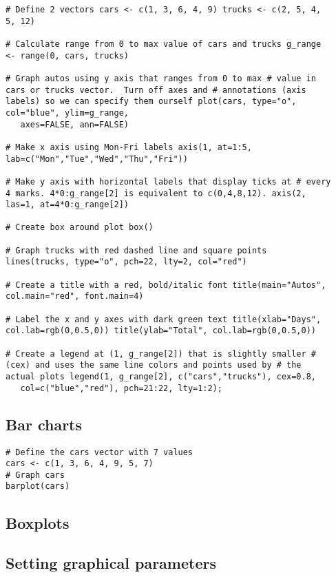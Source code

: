 \begin{frame}
\begin{myindentpar}{1cm}
\begin{verbatim}
# Define 2 vectors cars <- c(1, 3, 6, 4, 9) trucks <- c(2, 5, 4,
5, 12)

# Calculate range from 0 to max value of cars and trucks g_range
<- range(0, cars, trucks)

# Graph autos using y axis that ranges from 0 to max # value in
cars or trucks vector.  Turn off axes and # annotations (axis
labels) so we can specify them ourself plot(cars, type="o",
col="blue", ylim=g_range,
   axes=FALSE, ann=FALSE)

# Make x axis using Mon-Fri labels axis(1, at=1:5,
lab=c("Mon","Tue","Wed","Thu","Fri"))

# Make y axis with horizontal labels that display ticks at # every
4 marks. 4*0:g_range[2] is equivalent to c(0,4,8,12). axis(2,
las=1, at=4*0:g_range[2])

# Create box around plot box()

# Graph trucks with red dashed line and square points
lines(trucks, type="o", pch=22, lty=2, col="red")

# Create a title with a red, bold/italic font title(main="Autos",
col.main="red", font.main=4)

# Label the x and y axes with dark green text title(xlab="Days",
col.lab=rgb(0,0.5,0)) title(ylab="Total", col.lab=rgb(0,0.5,0))

# Create a legend at (1, g_range[2]) that is slightly smaller #
(cex) and uses the same line colors and points used by # the
actual plots legend(1, g_range[2], c("cars","trucks"), cex=0.8,
   col=c("blue","red"), pch=21:22, lty=1:2);

\end{verbatim}
\end{myindentpar}
\subsection{Bar charts}
\begin{myindentpar}{1cm}
\begin{verbatim}
# Define the cars vector with 7 values
cars <- c(1, 3, 6, 4, 9, 5, 7)
# Graph cars
barplot(cars)
\end{verbatim}
\end{myindentpar}
\subsection{Boxplots}
\subsection{Setting graphical parameters}

\end{frame}
